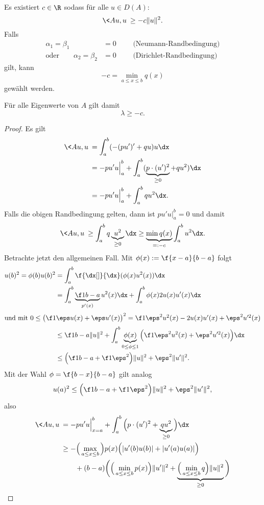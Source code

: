 \begin{lem} \label{3.15}
	Es existiert $c \in \R$ sodass für alle $u \in D(A)$:
	\[
		\<Au,u\> \ge -c \|u\|^2.
	\]
	Falls
	\begin{align*}
		\alpha_1 = \beta_1 &= 0 \qquad \text{ (Neumann-Randbedingung)}  \\
		\text{oder} \qquad
		\alpha_2 = \beta_2 &= 0 \qquad \text{ (Dirichlet-Randbedingung)}
	\end{align*}
	gilt, kann
	\[
		-c = \min_{a \le x \le b} q(x) 
	\]
	gewählt werden.

	Für alle Eigenwerte von $A$ gilt damit
	\[
		\lambda \ge -c.
	\]
	\begin{proof}
		Es gilt 
		\begin{align*}
			\<Au,u\> 
			&= \int_a^b (-(pu')' + qu) u \dx \\
			&= -pu'u \Big|_a^b + \int_a^b (\underbrace{p\cdot(u')^2}_{\ge 0} + qu^2) \dx \\
			&= -pu'u \Big|_a^b + \int_a^b q u^2 \dx.
		\end{align*}
		Falls die obigen Randbedingung gelten, dann ist $pu'u \big|_a^b = 0$ und damit 
		\[
			\<Au,u\> 
			\ge  \int_a^b q \underbrace{u^2}_{\ge 0} \dx 
			\ge \underbrace{\min q(x)}_{=: -c} \int_a^b u^2 \dx.
		\]
		Betrachte jetzt den allgemeinen Fall.
		Mit $\phi(x) := \f {x-a}{b-a}$ folgt
		\begin{align*}
			u(b)^2
			= \phi(b) u(b)^2
			&= \int_a^b \f {\dx[]}{\dx} (\phi(x) u^2(x)) \dx \\
			&= \int_a^b \underbrace{\f 1{b-a}}_{p'(x)} u^2(x) \dx + \int_a^b \phi(x) 2u(x) u'(x) \dx \\
		\intertext{und mit $0 \le \big( \f 1\eps u(x) + \eps u'(x) \big)^2 = \f 1{\eps^2} u^2(x) - 2u(x)u'(x) + \eps^2 u'^2(x)$}
			&\le \f 1{b-a}\|u\|^2 + \int_a^b \underbrace{\phi(x)}_{0 \le \phi \le 1} \Big( \f 1{\eps^2} u^2(x) + \eps^2 u'^2(x) \Big) \dx \\
			&\le \Big( \f 1{b-a} + \f 1{\eps^2}\Big)\|u\|^2 + \eps^2 \|u'\|^2.
		\end{align*}
		Mit der Wahl $\phi = \f {b-x}{b-a}$ gilt analog
		\[
			u(a)^2 \le \Big( \f 1{b-a} + \f 1{\eps^2}\Big)\|u\|^2 + \eps^2 \|u'\|^2,
		\]
		also
		\begin{align*}
			\<Au,u\> 
			&= -pu'u \Big|_{x=a}^b + \int_a^b \Big(p\cdot (u')^2 + \underbrace{qu^2}_{\ge 0}\Big) \dx \\
			&\ge - \Big( \max_{a \le x \le b} \Big) p(x) \Big( |u'(b)u(b)| + |u'(a)u(a)|\Big) \\
				&\qquad+ (b-a)\bigg(\Big( \min_{a \le x \le b} p(x) \Big) \|u'\|^2 + \underbrace{\Big(\min_{a \le x \le b} q \Big) \|u\|^2}_{\ge 0}\bigg)

\end{align*}
\end{proof}
\end{lem}
